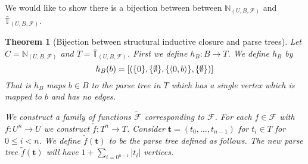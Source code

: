 \documentclass[12pt]{article}
\theoremstyle{break}
\theoremstyle{break}
\newtheorem{theorem}{Theorem}[section]
\theoremstyle{break}
\theoremstyle{break}
\theoremstyle{break}
\newtheorem{informal definition}[definition]{Informal Definition}
\newcommand{\bv}[1]{\boldsymbol{#1}}
\begin{document}
We would like to show there is a bijection between between $\mathbb{N}_{(U, B, \mathcal{F})}$ and $\bar{\mathbb{T}}_{(U, B, \mathcal{F})}$.

\begin{theorem}[Bijection between structural inductive closure and parse trees]
Let $C = \mathbb{N}_{(U, B, \mathcal{F})}$ and $T = \bar{\mathbb{T}}_{(U, B, \mathcal{F})}$.
First we define $h_B:B \to T$.
We define $h_B$ by
$$
h_B(b) = [(\{0\}, \{\emptyset\}, \{\braket{0, b}\}, \{\emptyset\})]
$$
That is $h_B$ maps $b\in B$ to the parse tree in $T$ which has a single vertex which is mapped to $b$ and has no edges.

We construct a family of functions $\tilde{\mathcal{F}}$ corresponding to $\mathcal{F}$.
For each $f\in \mathcal{F}$ with $f:U^n \to U$ we construct $\tilde{f}:T^n \to T$.
Consider $\bv{t} = (t_0, \ldots, t_{n-1})$ for $t_i\in T$ for $0\le i < n$.
We define $\tilde{f}(\bv{t})$ to be the parse tree defined as follows.
The new parse tree $\tilde{f}(\bv{t})$ will have $1 + \sum_{i=0^{n-1}} |t_i|$ vertices.
\end{theorem}
\end{document}
